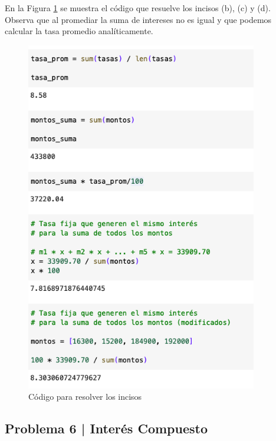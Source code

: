 \documentclass{article}
\begin{document}
\break
\noindent
En la Figura \ref{fig:s105-2} se muestra el código que resuelve los incisos (b), (c) y (d). Observa que al promediar la suma de intereses no es igual y que podemos calcular la tasa promedio analíticamente.
\begin{figure}[!ht]
    \centering
    \begin{minipage}{\textwidth}
        \centering
        \includegraphics[width=0.9\textwidth]{figures/s105-2.png}
    \end{minipage}
    \captionsetup{width=0.9\textwidth}
    \caption{Código para resolver los incisos}
    \label{fig:s105-2}
\end{figure}

\clearpage

\subsection*{Problema 6 | Interés Compuesto}
\end{document}
